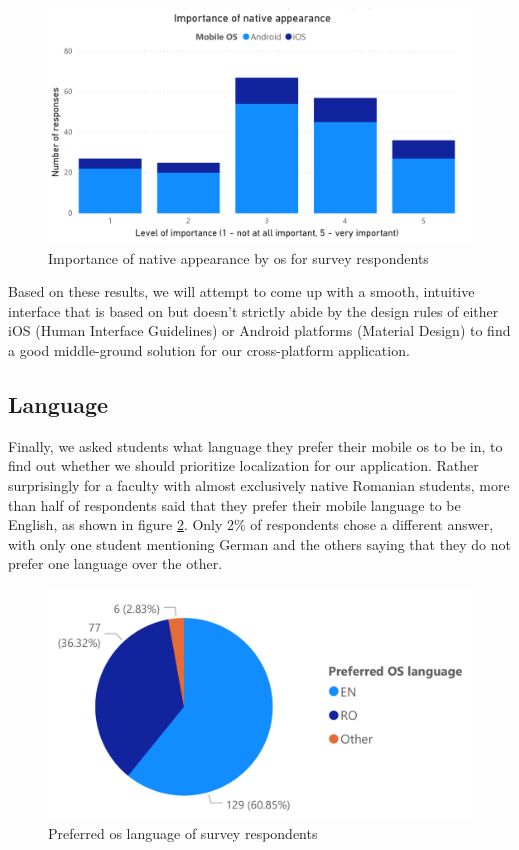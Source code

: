 \begin{figure}[ht]
    \centering
         \includegraphics[width=\textwidth]{figures/charts/survey/native_appearance.pdf}
    \caption{Importance of native appearance by \acrshort{os} for survey respondents}
    \label{3:fig:native_appearance}
\end{figure}

Based on these results, we will attempt to come up with a smooth, intuitive interface that is based on but doesn't strictly abide by the design rules of either iOS (Human Interface Guidelines\cite{apple2020human}) or Android platforms (Material Design\cite{google2020material}) to find a good middle-ground solution for our cross-platform application.

\subsection{Language} \label{3:language}

Finally, we asked students what language they prefer their mobile \acrshort{os} to be in, to find out whether we should prioritize localization for our application. Rather surprisingly for a faculty with almost exclusively native Romanian students, more than half of respondents said that they prefer their mobile language to be English, as shown in figure \ref{3:fig:language}. Only 2\% of respondents chose a different answer, with only one student mentioning German and the others saying that they do not prefer one language over the other.

\begin{figure}[ht]
    \centering
         \includegraphics[height=0.2\textheight]{figures/charts/survey/language.pdf}
    \caption{Preferred \acrshort{os} language of survey respondents}
    \label{3:fig:language}
\end{figure}

